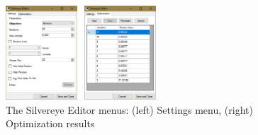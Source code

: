\begin{figure}
\centering
\includegraphics[width=0.5\textwidth]{Images/Background/Silvereye/general-view.png}
\caption[Silvereye optimization plug-in menus]{The Silvereye Editor menus: (left) Settings menu, (right) Optimization results}
\label{fig:silvereye}
\end{figure}
